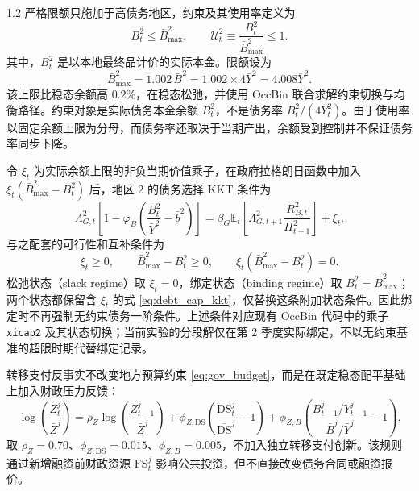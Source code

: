 \documentclass[12pt,UTF8]{ctexart}
\newcommand{\E}{\mathbb{E}}
\newcommand{\DS}{\mathrm{DS}}
\newcommand{\FS}{\mathrm{FS}}
\begin{document}
\begin{spacing}{1.2}
		严格限额只施加于高债务地区，约束及其使用率定义为
		\begin{equation}
			B_t^2\leq \bar B_{\max}^2,\qquad
			\mathcal U_t^2\equiv \frac{B_t^2}{\bar B_{\max}^2}\leq 1.
			\label{eq:strict_debt_cap}
		\end{equation}
		其中，$B_t^2$ 是以本地最终品计价的实际本金。限额设为
		\begin{equation}
			\bar B_{\max}^2=1.002\,\bar B^2=1.002\times4\bar Y^2=4.008\bar Y^2.
			\label{eq:strict_debt_cap_value}
		\end{equation}
		该上限比稳态余额高 $0.2\%$，在稳态松弛，并使用 OccBin 联合求解约束切换与均衡路径。约束对象是实际债务本金余额 $B_t^2$，不是债务率 $B_t^2/(4Y_t^2)$。由于使用率以固定余额上限为分母，而债务率还取决于当期产出，余额受到控制并不保证债务率同步下降。

		令 $\xi_t$ 为实际余额上限的非负当期价值乘子，在政府拉格朗日函数中加入 $\xi_t(\bar B_{\max}^2-B_t^2)$ 后，地区 2 的债务选择 KKT 条件为
		\begin{equation}
			\Lambda_{G,t}^2\left[1-\varphi_B\left(\frac{B_t^2}{\bar Y^2}-\bar b^2\right)\right]
			=\beta_G\E_t\left[\Lambda_{G,t+1}^2\frac{R_{B,t}^2}{\Pi_{t+1}^2}\right]+\xi_t.
			\label{eq:debt_cap_kkt}
		\end{equation}
		与之配套的可行性和互补条件为
		\begin{equation}
			\xi_t\geq0,\qquad \bar B_{\max}^2-B_t^2\geq0,\qquad
			\xi_t(\bar B_{\max}^2-B_t^2)=0.
			\label{eq:debt_cap_complementarity}
		\end{equation}
		松弛状态（slack regime）取 $\xi_t=0$，绑定状态（binding regime）取 $B_t^2=\bar B_{\max}^2$；两个状态都保留含 $\xi_t$ 的式 \eqref{eq:debt_cap_kkt}，仅替换这条附加状态条件。因此绑定时不再强制无约束债务一阶条件。上述条件对应现有 OccBin 代码中的乘子 \texttt{xicap2} 及其状态切换；当前实验的分段解仅在第 2 季度实际绑定，不以无约束基准的超限时期代替绑定记录。
		
		转移支付反事实不改变地方预算约束 \eqref{eq:gov_budget}，而是在既定稳态配平基础上加入财政压力反馈：
		\begin{equation}
			\log\left(\frac{Z_t^j}{\bar Z^j}\right)
			=\rho_Z\log\left(\frac{Z_{t-1}^j}{\bar Z^j}\right)
			+\phi_{Z,\DS}\left(\frac{\DS_t^j}{\overline{\DS}^j}-1\right)
			+\phi_{Z,B}\left(\frac{B_{t-1}^j/Y_{t-1}^j}{\bar B^j/\bar Y^j}-1\right).
			\label{eq:Z_rule_ext}
		\end{equation}
		取 $\rho_Z=0.70$、$\phi_{Z,\DS}=0.015$、$\phi_{Z,B}=0.005$，不加入独立转移支付创新。该规则通过新增融资前财政资源 $\FS_t^j$ 影响公共投资，但不直接改变债务合同或融资报价。
		

\end{spacing}
\end{document}
